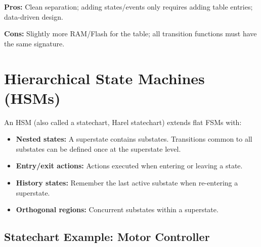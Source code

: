 \textbf{Pros:} Clean separation; adding states/events only requires adding table entries; data-driven design.

\textbf{Cons:} Slightly more RAM/Flash for the table; all transition functions must have the same signature.

\section{Hierarchical State Machines (HSMs)}
\label{sec:mod:hsm}

\begin{definition}
An HSM (also called a statechart, Harel statechart) extends flat FSMs with:
\begin{itemize}[nosep]
  \item \textbf{Nested states:} A superstate contains substates. Transitions common to all substates can be defined once at the superstate level.
  \item \textbf{Entry/exit actions:} Actions executed when entering or leaving a state.
  \item \textbf{History states:} Remember the last active substate when re-entering a superstate.
  \item \textbf{Orthogonal regions:} Concurrent substates within a superstate.
\end{itemize}
\end{definition}

\subsection{Statechart Example: Motor Controller}

